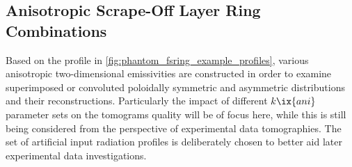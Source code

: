         \subsection{Anisotropic Scrape-Off Layer Ring Combinations}\label{subsec:phantoms_anirings}%
%
            Based on the profile in \cref{fig:phantom_fsring_example_profiles}, various anisotropic two-dimensional emissivities are constructed in order to examine superimposed or convoluted poloidally symmetric and asymmetric distributions and their reconstructions. Particularly the impact of different $k\ix{ani}$ parameter sets on the tomograms quality will be of focus here, while this is still being considered from the perspective of experimental data tomographies. The set of artificial input radiation profiles is deliberately chosen to better aid later experimental data investigations.\\%
%
